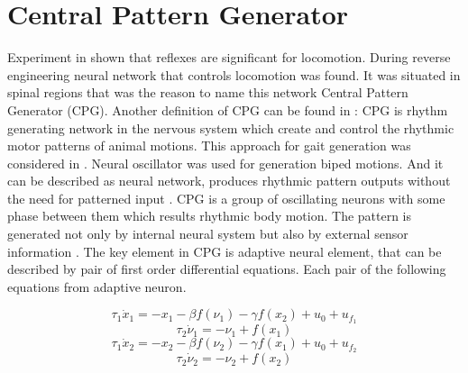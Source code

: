 \documentclass[11pt,a4paper]{report}
\begin{document}
	\section{Central Pattern Generator}

		Experiment in \cite{grillner1975locomotion} shown that reflexes are significant for locomotion. During reverse engineering neural network that controls locomotion was found. It was situated in spinal regions that was the reason to name this network Central Pattern Generator (CPG).
		Another definition of CPG can be found in \cite{lee2007construction}: CPG is rhythm generating network in the nervous system which create and control the rhythmic motor patterns of animal motions. This approach for gait generation was considered in \cite{miyakoshi1998three}. Neural oscillator was used for generation biped motions. And it can be described as neural network, produces rhythmic pattern outputs without the need for patterned input \cite{wright2014intelligent}. CPG is a group of oscillating neurons with some phase between them which results rhythmic body motion. The pattern is generated not only by internal neural system but also by external sensor information \cite{miyakoshi1998three}. The key element in CPG is adaptive neural element, that can be described by pair of first order differential equations. Each pair of the following equations from adaptive neuron.

		\begin{equation}\label{eq:CPG1}
			\tau_1 \dot{x}_1 = -x_1 - \beta f(\nu_1) -  \gamma f(x_2) + u_0 + u_{f_1}
		\end{equation}
		\begin{equation}\label{eq:CPG2}
			\tau_2 \dot{\nu}_1 = -\nu_1  + f(x_1)
		\end{equation}
		\begin{equation}\label{eq:CPG3}
			\tau_1 \dot{x}_2 = -x_2 - \beta f(\nu_2) -  \gamma f(x_1) + u_0 + u_{f_2}
		\end{equation}
		\begin{equation}\label{eq:CPG4}
			\tau_2 \dot{\nu}_2 = -\nu_2  + f(x_2)
		\end{equation}
\end{document}
